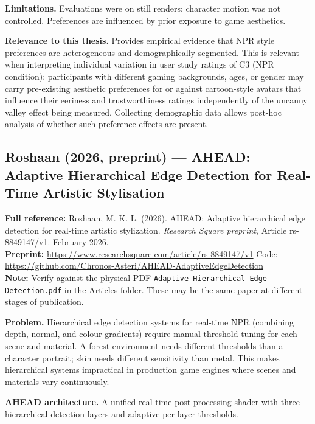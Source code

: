 \documentclass[11pt, a4paper]{article}
\begin{document}
\textbf{Limitations.} Evaluations were on still renders; character motion was not controlled. Preferences are influenced by prior exposure to game aesthetics.

\textbf{Relevance to this thesis.} Provides empirical evidence that NPR style preferences are heterogeneous and demographically segmented. This is relevant when interpreting individual variation in user study ratings of C3 (NPR condition): participants with different gaming backgrounds, ages, or gender may carry pre-existing aesthetic preferences for or against cartoon-style avatars that influence their eeriness and trustworthiness ratings independently of the uncanny valley effect being measured. Collecting demographic data allows post-hoc analysis of whether such preference effects are present.

\vspace{8pt}
\subsection{Roshaan (2026, preprint) --- AHEAD: Adaptive Hierarchical Edge Detection for Real-Time Artistic Stylisation}

\begin{refbox}
\textbf{Full reference:} Roshaan, M. K. L. (2026). AHEAD: Adaptive hierarchical edge detection for real-time artistic stylization. \textit{Research Square preprint}, Article rs-8849147/v1. February 2026.\\[4pt]
\textbf{Preprint:} \url{https://www.researchsquare.com/article/rs-8849147/v1} \quad Code: \url{https://github.com/Chronos-Asteri/AHEAD-AdaptiveEdgeDetection}\\[4pt]
\textbf{Note:} Verify against the physical PDF \texttt{Adaptive Hierarchical Edge Detection.pdf} in the Articles folder. These may be the same paper at different stages of publication.
\end{refbox}

\textbf{Problem.} Hierarchical edge detection systems for real-time NPR (combining depth, normal, and colour gradients) require manual threshold tuning for each scene and material. A forest environment needs different thresholds than a character portrait; skin needs different sensitivity than metal. This makes hierarchical systems impractical in production game engines where scenes and materials vary continuously.

\textbf{AHEAD architecture.} A unified real-time post-processing shader with three hierarchical detection layers and adaptive per-layer thresholds.
\end{document}
